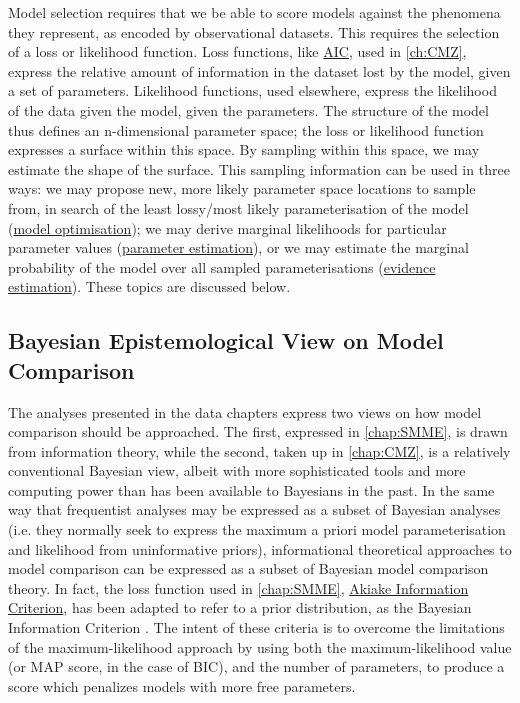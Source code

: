 Model selection requires that we be able to score models against the phenomena they represent, as encoded by observational datasets. This requires the selection of a loss or likelihood function. Loss functions, like \hyperref[AIC]{AIC}, used in \autoref{ch:CMZ}, express the relative amount of information in the dataset lost by the model, given a set of parameters. Likelihood functions, used elsewhere, express the likelihood of the data given the model, given the parameters. The structure of the model thus defines an n-dimensional parameter space; the loss or likelihood function expresses a surface within this space. By sampling within this space, we may estimate the shape of the surface. This sampling information can be used in three ways: we may propose new, more likely parameter space locations to sample from, in search of the least lossy/most likely parameterisation of the model (\hyperref[opt]{model optimisation}); we may derive marginal likelihoods for particular parameter values (\hyperref[est]{parameter estimation}), or we may estimate the marginal probability of the model over all sampled parameterisations (\hyperref[evi]{evidence estimation}). These topics are discussed below.

\subsection{Bayesian Epistemological View on Model Comparison}
The analyses presented in the data chapters express two views on how model comparison should be approached. The first, expressed in \autoref{chap:SMME}, is drawn from information theory, while the second, taken up in \autoref{chap:CMZ}, is a relatively conventional Bayesian view, albeit with more sophisticated tools and more computing power than has been available to Bayesians in the past. In the same way that frequentist analyses may be expressed as a subset of Bayesian analyses (i.e. they normally seek to express the maximum a priori model parameterisation and likelihood from uninformative priors), informational theoretical approaches to model comparison can be expressed as a subset of Bayesian model comparison theory. In fact, the loss function used in \autoref{chap:SMME}, \hyperref[AIC]{Akiake Information Criterion}, has been adapted to refer to a prior distribution, as the Bayesian Information Criterion \cite{Posada2004}. The intent of these criteria is to overcome the limitations of the maximum-likelihood approach by using both the maximum-likelihood value (or MAP score, in the case of BIC), and the number of parameters, to produce a score which penalizes models with more free parameters.


